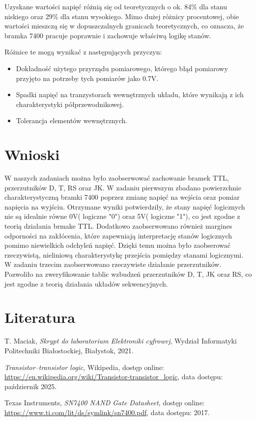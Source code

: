 \documentclass{article}
\begin{document}
Uzyskane wartości napięć różnią się od teoretycznych o ok. 84\% dla stanu niskiego oraz 29\% dla stanu wysokiego.
Mimo dużej różnicy procentowej, obie wartości mieszczą się w dopuszczalnych granicach teoretycznych, co oznacza, że bramka 7400 pracuje poprawnie i zachowuje właściwą logikę stanów.\linebreak

Różnice te mogą wynikać z następujących przyczyn:

\begin{itemize}
	\item Dokładność użytego przyrządu pomiarowego, którego błąd pomiarowy przyjęto na potrzeby tych pomiarów jako 0.7V.
	\item Spadki napięć na tranzystorach wewnętrznych układu, które wynikają z ich charakterystyki półprzewodnikowej.
	\item Tolerancja elementów wewnętrznych.
\end{itemize}

\section{Wnioski}
W naszych zadaniach można było zaobserwować zachowanie bramek TTL, przerzutników D, T, RS oraz JK. W zadaniu pierwszym zbadano powierzchnie charakterystyczną bramki 7400 poprzez zmianę napięć na wejścia oraz pomiar napięcia na wyjściu. Otrzymane wyniki potwierdziły, że stany napięć logicznych nie są idealnie równe 0V( logiczne "0") oraz 5V( logiczne "1"), co jest zgodne z teorią działania brmake TTL. Dodatkowo zaobserwowano również margines odporności na zakłócenia, które zapewniają interpretację stanów logicznych pomimo niewielkich odchyleń napięć. Dzięki temu można było zaobserować rzeczywistą, nieliniową charakterystykę przejścia pomiędzy stanami logicznymi.\\

W zadaniu trzecim zaobserwowano rzeczywiste działanie przerzutników. Pozwoliło na zweryfikowanie tablic wzbudzeń przerzutników D, T, JK oraz RS, co jest zgodne z teorią działania układów sekwencyjnych.
\pagebreak
\section{Literatura}

\renewcommand{\refname}{}

\begin{thebibliography}{9}
	
	T. Maciak, \textit{Skrypt do laboratorium Elektroniki cyfrowej}, 
	Wydział Informatyki Politechniki Białostockiej, Białystok, 2021.
	
	\textit{Transistor–transistor logic}, Wikipedia, dostęp online: 
	\url{https://en.wikipedia.org/wiki/Transistor-transistor_logic}, 
	data dostępu: październik 2025.
	
	Texas Instruments, \textit{SN7400 NAND Gate Datasheet}, dostęp online: 
	\url{https://www.ti.com/lit/ds/symlink/sn7400.pdf}, 
	data dostępu: 2017.
	
\end{thebibliography}
\end{document}
